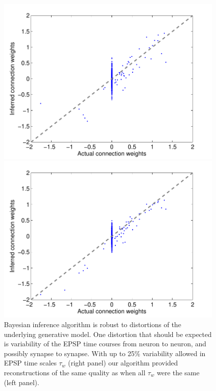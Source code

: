 \begin{figure}[h]
\centering
\begin{minipage}[c]{0.45\hsize}
\includegraphics[width=\hsize]{../figs/FigureA9_all_same_sol}
\end{minipage}
\begin{minipage}[c]{0.45\hsize}
\includegraphics[width=\hsize]{../figs/FigureA9_variable_25}
\end{minipage}
\caption{Bayesian inference algorithm is robust to distortions of the
underlying generative model. One distortion that should be expected is variability of the EPSP time courses from neuron to neuron, and possibly synapse to synapse. 
With up to 25\% variability allowed in EPSP time scales $\tau_w$ (right panel) our algorithm provided reconstructions of the same quality as when all $\tau_w$ were the same (left panel).}
\label{fig:vartau}
\end{figure}

